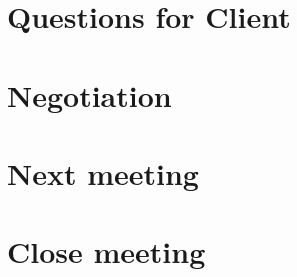 \documentclass[11pt, a4paper]{article}
\begin{document}
\section{Questions for Client}


\section{Negotiation}


\section{Next meeting}

\section {Close meeting}
\vspace*{10pt}
\end{document}
